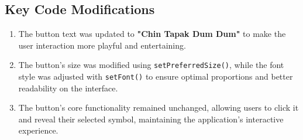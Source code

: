 \documentclass[12pt, a4paper]{article}
\begin{document}
\subsection*{Key Code Modifications}
\hspace{1.5cm}
\begin{enumerate}
    \item The button text was updated to \textbf{"Chin Tapak Dum Dum"} to make the user interaction more playful and entertaining.
    \item The button’s size was modified using \texttt{setPreferredSize()}, while the font style was adjusted with \texttt{setFont()} to ensure optimal proportions and better readability on the interface.
    \item The button’s core functionality remained unchanged, allowing users to click it and reveal their selected symbol, maintaining the application’s interactive experience.
\end{enumerate}
\newpage
{}
\vspace{-2cm}
\end{document}
